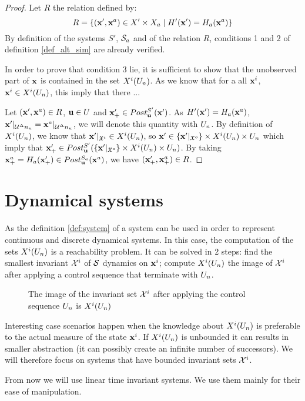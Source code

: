 \begin{proof}
Let $R$ the relation defined by:
\begin{equation}
R = \{ ( \mathbf{x}', \mathbf{x}^a) \in X' \times X_a \mid H'( \mathbf{x}') = H_a( \mathbf{x}^a) \}
\end{equation}
By definition of the systems $S'$, $\mathcal{S}_a$ and of the relation $R$, conditions 1 and 2 of definition \ref{def_alt_sim} are already verified.

In order to prove that condition 3 lie, it is sufficient to show that the unobserved part of $ \mathbf{x}$ is contained in the set $X^i(U_n)$.
As we know that for a all $ \mathbf{x}^i$,$  \mathbf{x}^i \in X^i(U_n)$, this imply that there ...

Let $( \mathbf{x}', \mathbf{x}^a) \in R$, $ \mathbf{u} \in U$ and $ \mathbf{x}'_+ \in Post_{ \mathbf{u}}^{S'}( \mathbf{x}')$.
As $H'( \mathbf{x}') = H_a( \mathbf{x}^a)$, $ \mathbf{x}' |_{\mathcal{U}^\Delta n_u} =  \mathbf{x}^a |_{\mathcal{U}^\Delta n_u}$, we will denote this quantity with $U_n$.
By definition of $X^i(U_n)$,
we know that $ \mathbf{x}' |_{\mathfrak{X}^i} \in X^i(U_n)$,
so
$ \mathbf{x}' \in \{ \mathbf{x}' |_{\mathfrak{X}^o} \} \times X^i(U_n) \times U_n$
which imply that
$ \mathbf{x}'_+ \in Post_{ \mathbf{u}}^{S'}(\{ \mathbf{x}' |_{\mathfrak{X}^o} \} \times X^i(U_n) \times U_n )$.
By taking $ \mathbf{x}^a_+ = H_a( \mathbf{x}'_+) \in Post_{ \mathbf{u}}^{S_a}( \mathbf{x}^a)$,
we have $( \mathbf{x}'_+, \mathbf{x}^a_+) \in R$.
\end{proof}

\section{Dynamical systems}
As the definition \ref{def:system} of a system can be used in order to represent continuous and discrete dynamical systems.
In this case, the computation of the sets $X^i(U_n)$ is a reachability problem.
It can be solved in 2 steps: find the smallest invariant ${\mathcal{X}^i}$ of $\mathcal{S}$ dynamics on $ \mathbf{x}^i$; compute $X^i(U_n)$ the image of ${\mathcal{X}^i}$ after applying a control sequence that terminate with $U_n$.

\begin{figure}
\centering
\caption{The image of the invariant set ${\mathcal{X}^i}$ after applying the control sequence $U_n$ is $X^i(U_n)$}
\end{figure}

Interesting case scenarios happen when the knowledge about $X^i(U_n)$ is preferable to the actual measure of the state $ \mathbf{x}^i$.
If $X^i(U_n)$ is unbounded it can results in smaller abstraction (it can possibly create an infinite number of successors).
We will therefore focus on systems that have bounded invariant sets ${\mathcal{X}^i}$.

From now we will use linear time invariant systems. We use them mainly for their ease of manipulation.